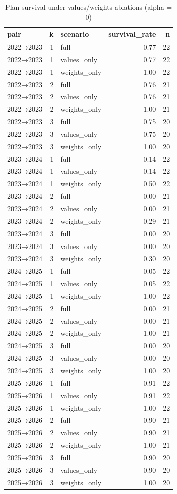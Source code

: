 \begin{table}[htbp]
\centering
\caption{Plan survival under values/weights ablations (alpha = 0)}
\label{tab:e2-ablation}
\begin{tabular}{lrlrr}
\toprule
pair & k & scenario & survival\_rate & n \\
\midrule
2022→2023 & 1 & full & 0.77 & 22 \\
2022→2023 & 1 & values\_only & 0.77 & 22 \\
2022→2023 & 1 & weights\_only & 1.00 & 22 \\
2022→2023 & 2 & full & 0.76 & 21 \\
2022→2023 & 2 & values\_only & 0.76 & 21 \\
2022→2023 & 2 & weights\_only & 1.00 & 21 \\
2022→2023 & 3 & full & 0.75 & 20 \\
2022→2023 & 3 & values\_only & 0.75 & 20 \\
2022→2023 & 3 & weights\_only & 1.00 & 20 \\
2023→2024 & 1 & full & 0.14 & 22 \\
2023→2024 & 1 & values\_only & 0.14 & 22 \\
2023→2024 & 1 & weights\_only & 0.50 & 22 \\
2023→2024 & 2 & full & 0.00 & 21 \\
2023→2024 & 2 & values\_only & 0.00 & 21 \\
2023→2024 & 2 & weights\_only & 0.29 & 21 \\
2023→2024 & 3 & full & 0.00 & 20 \\
2023→2024 & 3 & values\_only & 0.00 & 20 \\
2023→2024 & 3 & weights\_only & 0.30 & 20 \\
2024→2025 & 1 & full & 0.05 & 22 \\
2024→2025 & 1 & values\_only & 0.05 & 22 \\
2024→2025 & 1 & weights\_only & 1.00 & 22 \\
2024→2025 & 2 & full & 0.00 & 21 \\
2024→2025 & 2 & values\_only & 0.00 & 21 \\
2024→2025 & 2 & weights\_only & 1.00 & 21 \\
2024→2025 & 3 & full & 0.00 & 20 \\
2024→2025 & 3 & values\_only & 0.00 & 20 \\
2024→2025 & 3 & weights\_only & 1.00 & 20 \\
2025→2026 & 1 & full & 0.91 & 22 \\
2025→2026 & 1 & values\_only & 0.91 & 22 \\
2025→2026 & 1 & weights\_only & 1.00 & 22 \\
2025→2026 & 2 & full & 0.90 & 21 \\
2025→2026 & 2 & values\_only & 0.90 & 21 \\
2025→2026 & 2 & weights\_only & 1.00 & 21 \\
2025→2026 & 3 & full & 0.90 & 20 \\
2025→2026 & 3 & values\_only & 0.90 & 20 \\
2025→2026 & 3 & weights\_only & 1.00 & 20 \\
\bottomrule
\end{tabular}
\end{table}
